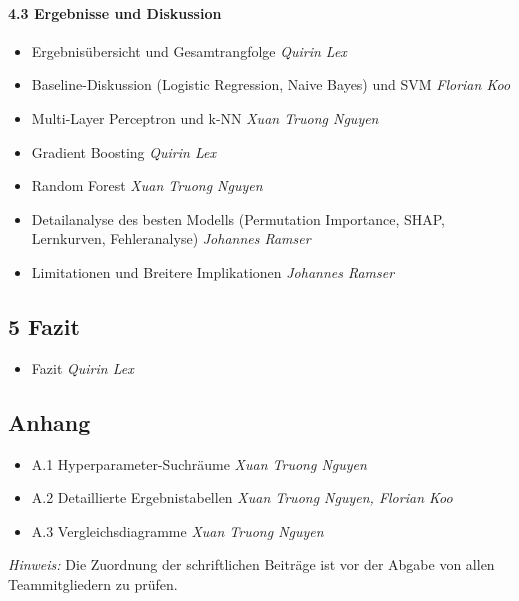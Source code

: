 \documentclass[11pt]{scrartcl}
\newcommand{\by}[1]{\hfill\textit{#1}}
\begin{document}
\paragraph{4.3 Ergebnisse und Diskussion}
\begin{itemize}
	\item Ergebnisübersicht und Gesamtrangfolge \by{Quirin Lex}
	\item Baseline-Diskussion (Logistic Regression, Naive Bayes) und SVM \by{Florian Koo}
	\item Multi-Layer Perceptron und k-NN \by{Xuan Truong Nguyen}
	\item Gradient Boosting \by{Quirin Lex}
	\item Random Forest \by{Xuan Truong Nguyen}
	\item Detailanalyse des besten Modells (Permutation Importance, SHAP, Lernkurven, Fehleranalyse) \by{Johannes Ramser}
	\item Limitationen und Breitere Implikationen \by{Johannes Ramser}
\end{itemize}

\subsection*{5 Fazit}
\begin{itemize}
	\item Fazit \by{Quirin Lex}
\end{itemize}

\subsection*{Anhang}
\begin{itemize}
	\item A.1 Hyperparameter-Suchräume \by{Xuan Truong Nguyen}
	\item A.2 Detaillierte Ergebnistabellen \by{Xuan Truong Nguyen, Florian Koo}
	\item A.3 Vergleichsdiagramme \by{Xuan Truong Nguyen}
\end{itemize}

\bigskip
\noindent
\emph{Hinweis:} Die Zuordnung der schriftlichen Beiträge ist vor der Abgabe von allen
Teammitgliedern zu prüfen.
\end{document}
